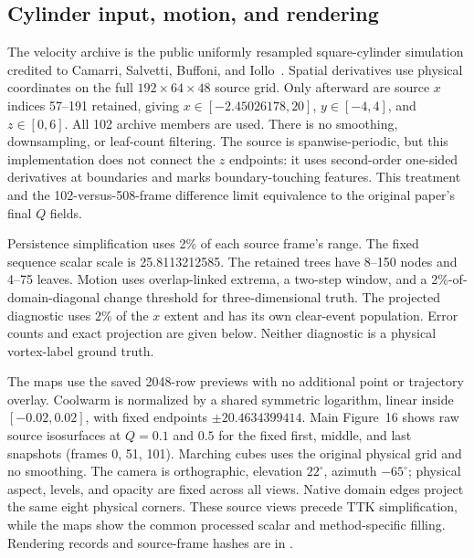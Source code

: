 \subsection{Cylinder input, motion, and rendering}
The velocity archive is the public uniformly resampled square-cylinder simulation credited to Camarri, Salvetti, Buffoni, and Iollo~\cite{Camarri:2005:Cylinder,Weinkauf:SquareCylinder,Funck:2008:Smoke}. Spatial derivatives use physical coordinates on the full $192\times64\times48$ source grid. Only afterward are source $x$ indices 57--191 retained, giving $x\in[-2.45026178,20]$, $y\in[-4,4]$, and $z\in[0,6]$. All 102 archive members are used. There is no smoothing, downsampling, or leaf-count filtering. The source is spanwise-periodic, but this implementation does not connect the $z$ endpoints: it uses second-order one-sided derivatives at boundaries and marks boundary-touching features. This treatment and the 102-versus-508-frame difference limit equivalence to the original paper's final $Q$ fields.

Persistence simplification uses 2\% of each source frame's range. The fixed sequence scalar scale is 25.8113212585. The retained trees have 8--150 nodes and 4--75 leaves. Motion uses overlap-linked extrema, a two-step window, and a 2\%-of-domain-diagonal change threshold for three-dimensional truth. The projected diagnostic uses 2\% of the $x$ extent and has its own clear-event population. Error counts and exact projection are given below. Neither diagnostic is a physical vortex-label ground truth.

The maps use the saved 2048-row previews with no additional point or trajectory overlay. Coolwarm is normalized by a shared symmetric logarithm, linear inside $[-0.02,0.02]$, with fixed endpoints $\pm20.4634399414$. Main Figure~16 shows raw source isosurfaces at $Q=0.1$ and $0.5$ for the fixed first, middle, and last snapshots (frames 0, 51, 101). Marching cubes uses the original physical grid and no smoothing. The camera is orthographic, elevation $22^\circ$, azimuth $-65^\circ$; physical aspect, levels, and opacity are fixed across all views. Native domain edges project the same eight physical corners. These source views precede TTK simplification, while the maps show the common processed scalar and method-specific filling. Rendering records and source-frame hashes are in .

